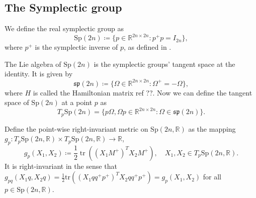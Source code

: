 \subsection{The Symplectic group}
We define the real symplectic group as
\begin{equation}
    \mathrm{Sp}(2n)\coloneqq \{p\in \mathbb{R}^{2n\times2n}:p^{+}p=I_{2n}\},
\end{equation}
where $p^{+}$ is the symplectic inverse of $p$, as defined in \cite{symplectic_inverse}. 

The Lie algebra of $\mathrm{Sp}(2n)$ is the symplectic groups' tangent space at the identity. It is given by 
\begin{equation}
    \mathfrak{sp}(2n)\coloneqq \{\Omega\in \mathbb{R}^{2n\times2n}:\Omega^{+}=-\Omega\},
\end{equation}
where $H$ is called the Hamiltonian matrix ref ??. %
Now we can define the tangent space of $\mathrm{Sp}(2n)$ at a point $p$ as
\begin{equation}
    T_{p}\mathrm{Sp}(2n)=\{p\Omega,\Omega p\in \mathbb{R}^{2n\times2n}:\Omega\in\mathfrak{sp}(2n)\}.
\end{equation}

Define the point-wise right-invariant metric on $\mathrm{Sp}(2n,\mathbb{R})$ as the mapping $g_{p}:T_{p}\mathrm{Sp}(2n,\mathbb{R})\times T_{p}\mathrm{Sp}(2n,\mathbb{R})\xrightarrow{}\mathbb{R}$, 
\begin{equation}\label{eq:sp_metric}
    g_{p}(X_{1},X_{2})\coloneqq\frac{1}{2}\operatorname{tr}((X_{1}M^{+})^{T}X_{2}M^{+}),\quad X_{1},X_{2}\in T_{p}\mathrm{Sp}(2n,\mathbb{R}).
\end{equation}
It is right-invariant in the sense that
$g_{pq}(X_{1}q,X_{2}q)=\tfrac{1}{2}\mathrm{tr}((X_{1}qq^{+}p^{+})^{T}X_{2}qq^{+}p^{+})=g_{p}(X_{1},X_{2})$ for all $p\in \mathrm{Sp}(2n,\mathbb{R})$.